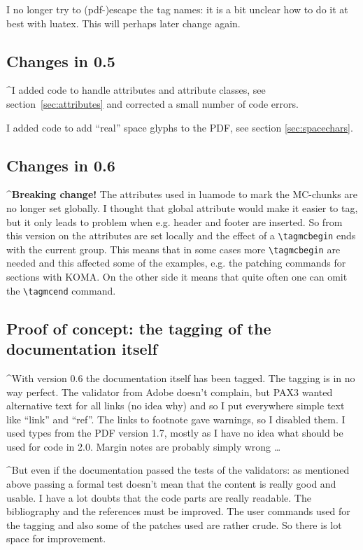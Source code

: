 \documentclass[DIV=12,parskip=half-,bibliography=totoc]{scrartcl}
\newcommand\PDF{PDF}
\begin{document}
\TagP
I no longer try to (pdf-)escape the tag names: it is a bit unclear how to do it at best with luatex. This will perhaps later change again.\TagPend

\subsection{Changes in 0.5}
\TagP^I added code to handle attributes and attribute classes, see section~\ref{sec:attributes} and corrected a small number of code errors.

\TagP I added code to add \enquote{real} space glyphs to the \PDF{}, see section \ref{sec:spacechars}.\TagPend


\subsection{Changes in 0.6}

\TagP^\textbf{Breaking change!} The attributes used in luamode to mark the MC-chunks are no longer set globally. I thought that global attribute would make it easier to tag, but it only leads to problem when e.g. header and footer are inserted. So from this version on the attributes are set locally and the effect of a \verb+\tagmcbegin+ ends with the current group. This means that in some cases more \verb+\tagmcbegin+ are needed and  this affected some of the examples, e.g. the patching commands for sections with KOMA. On the other side it means that quite often one can omit the \verb+\tagmcend+ command.\TagPend

\subsection{Proof of concept: the tagging of the documentation itself}
\TagP^With version 0.6 the documentation itself has been tagged. The tagging is in no way perfect. The validator from Adobe doesn't complain, but PAX3 wanted alternative text for all links (no idea why) and so I put everywhere simple text like \enquote{link} and \enquote{ref}. The links to footnote gave warnings, so I disabled them. I used types from the \PDF{} version 1.7, mostly as I have no idea what should be used for code in 2.0. Margin notes are probably simply wrong \ldots\TagPend

\TagP^But even if the documentation passed the tests of the validators:  as mentioned above passing a formal test doesn't mean that the content is really good and usable. I have a lot doubts that the code parts are really readable. The bibliography and the references must be improved. The user commands used for the tagging and also some of the patches used are rather crude. So there is lot space for improvement.\TagPend
\end{document}
